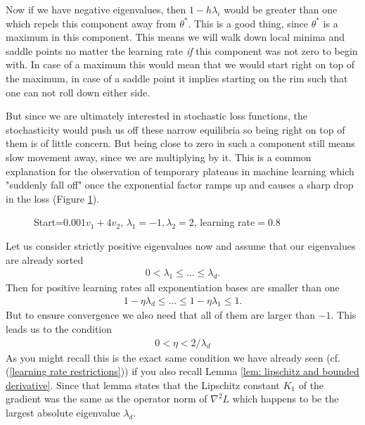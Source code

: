 Now if we have negative eigenvalues, then \(1-h\lambda_i\) would be greater
than one which repels this component away from \(\theta^*\). This is a good
thing, since \(\theta^*\) is a maximum in this component. This means we will
walk down local minima and saddle points no matter the learning rate \emph{if}
this component was not zero to begin with. In case of a maximum this would mean
that we would start right on top of the maximum, in case of a saddle point
it implies starting on the rim such that one can not roll down either side.

But since we are ultimately interested in stochastic loss functions, the
stochasticity would push us off these narrow equilibria so being right on
top of them is of little concern. But being close to zero in such a component
still means slow movement away, since we are multiplying by it. This is a
common explanation for the observation of temporary plateaus in machine learning
which "suddenly fall off" once the exponential factor ramps up and causes a
sharp drop in the loss (Figure \ref{fig: visualize saddlepoint gd}).

\begin{figure}[h]
	\centering
	\def\svgwidth{1\textwidth}
	
	\caption{Start=\(0.001v_1+4v_2\), \(\lambda_1=-1, \lambda_2=2\), learning rate\(=0.8\)}
	\label{fig: visualize saddlepoint gd}
\end{figure}


Let us consider strictly positive eigenvalues now and assume that our
eigenvalues are already sorted
%
\begin{align}
	0 < \lambda_1 \le \dots \le \lambda_d.
\end{align}
%
Then for positive learning rates all exponentiation bases are smaller than one
%
\begin{align*}
	1-\eta\lambda_d \le \dots \le 1-\eta\lambda_1 \le 1.
\end{align*}
%
But to ensure convergence we also need that all of them are larger than \(-1\).
This leads us to the condition
\begin{align}\label{eq: learning rate restriction (eigenvalue)}
	0< \eta < 2/\lambda_d
\end{align}
As you might recall
 this is the exact same condition we have already seen (cf.
(\ref{learning rate
restrictions})) if you also recall Lemma \ref{lem: lipschitz and bounded
derivative}.
Since that lemma states that the Lipschitz constant \(K_1\) of the gradient was the
same as the operator norm of \(\nabla^2 L\) which happens to be the largest 
absolute eigenvalue \(\lambda_d\).

